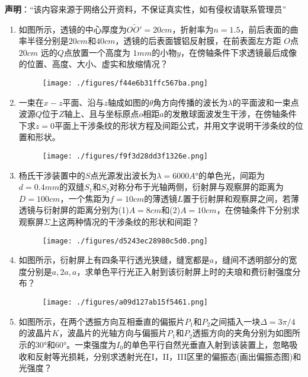

\textbf{声明}：“该内容来源于网络公开资料，不保证真实性，如有侵权请联系管理员”
\begin{enumerate}
\item 如图所示，透镜的中心厚度为$\bar{OO'}=20cm$，折射率为$n=1.5$，前后表面的曲率半径分别是$20cm$和$40cm$，透镜的后表面镀铝反射膜，在前表面左方距 $O$点 $20cm$ 远的$Q$点放置一个高度为 $1mm $的小物$y$，在傍轴条件下求透镜最后成像的位置、高度、大小、虚实和放缩情况？
\begin{figure}[ht]
\centering
\texttt{[image: ./figures/f44e6b31ffc567ba.png]}
\caption{} \label{fig_HGD04_2}
\end{figure}
\item 一束在$x-z$平面、沿与$z$轴成如图的$\theta$角方向传播的波长为$\lambda$的平面波和一束点波源$Q$位于$Z$轴上、且与坐标原点$o$相距$a$的发散球面波发生干涉，在傍轴条件下求$z=0$平面上干涉条纹的形状方程及间距公式，并用文字说明干涉条纹的位置和形状。
\begin{figure}[ht]
\centering
\texttt{[image: ./figures/f9f3d28dd3f1326e.png]}
\caption{} \label{fig_HGD04_1}
\end{figure}
\item 杨氏干涉装置中的$S$点光源发出波长为$\lambda=6000A$°的单色光，间距为$d=0.4mm$的双缝$S_1$和$S_2$对称分布于光轴两侧，衍射屏与观察屏的距离为$D=100cm$，一个焦距为$f=10cm$的薄透镜$L$置于衍射屏和观察屏之间，若薄透镜与衍射屏的距离分别为(1)$A=8cm$和(2)$A=10cm$，在傍轴条件下分别求观察屏$\Sigma$上这两种情况的干涉条纹的形状和间距？
\begin{figure}[ht]
\centering
\texttt{[image: ./figures/d5243ec28980c5d0.png]}
\caption{} \label{fig_HGD04_3}
\end{figure}
\item 如图所示，衍射屏上有四条平行透光狭缝，缝宽都是$a$，缝间不透明部分的宽度分别是$a,2a,a$，求单色平行光正入射到该衍射屏上时的夫琅和费衍射强度分布？
\begin{figure}[ht]
\centering
\texttt{[image: ./figures/a09d127ab15f5461.png]}
\caption{} \label{fig_HGD04_4}
\end{figure}
\item 如图所示，在两个透振方向互相垂直的偏振片$P_1$和$P_2$之间插入一块$\Delta=3\pi/4$的波晶片$K$，波晶片的光轴方向与偏振片$P_1$和$P_2$透振方向的夹角分别为如图所示的$30$°和$60$°。一束强度为$I_0$的单色平行自然光垂直入射到该装置上，忽略吸收和反射等光损耗，分别求透射光在I，II，III区里的偏振态(画出偏振态图)和光强度？

\end{enumerate}
